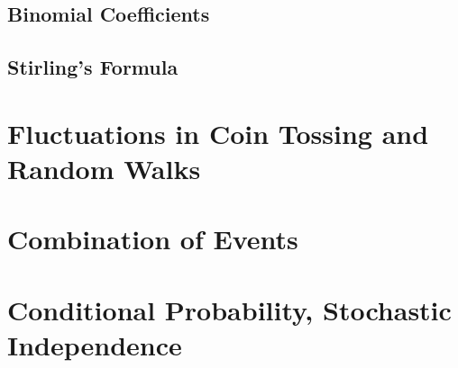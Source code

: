 \documentclass{article}
\numberwithin{equation}{subsection}
\begin{document}
		\subsection{Binomial Coefficients}
		\subsection{Stirling's Formula}
	\newpage
	\section{Fluctuations in Coin Tossing and Random Walks}
			
	\newpage
	\section{Combination of Events}
					
	\newpage
	\section{Conditional Probability, Stochastic Independence}
			
		
\end{document}
